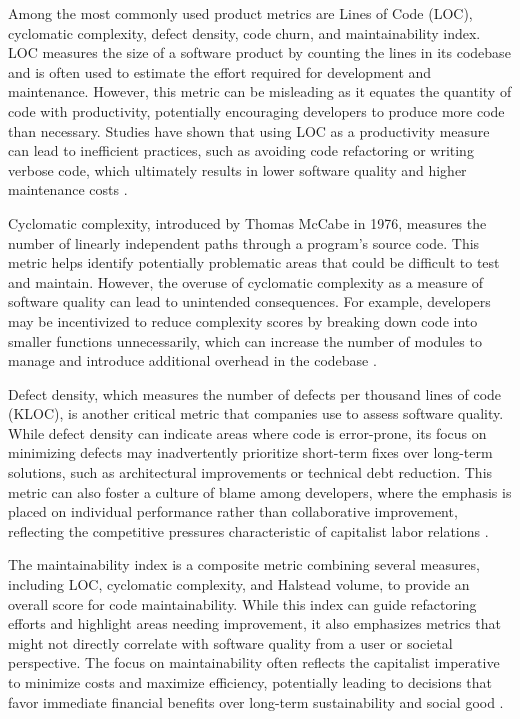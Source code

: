 \begin{refsection}
Among the most commonly used product metrics are Lines of Code (LOC), cyclomatic complexity, defect density, code churn, and maintainability index. LOC measures the size of a software product by counting the lines in its codebase and is often used to estimate the effort required for development and maintenance. However, this metric can be misleading as it equates the quantity of code with productivity, potentially encouraging developers to produce more code than necessary. Studies have shown that using LOC as a productivity measure can lead to inefficient practices, such as avoiding code refactoring or writing verbose code, which ultimately results in lower software quality and higher maintenance costs \cite[pp.~601-603]{Jones2010SoftwareEngineering}.

Cyclomatic complexity, introduced by Thomas McCabe in 1976, measures the number of linearly independent paths through a program’s source code. This metric helps identify potentially problematic areas that could be difficult to test and maintain. However, the overuse of cyclomatic complexity as a measure of software quality can lead to unintended consequences. For example, developers may be incentivized to reduce complexity scores by breaking down code into smaller functions unnecessarily, which can increase the number of modules to manage and introduce additional overhead in the codebase \cite[pp.~308-320]{McCabe1976ComplexityMeasure}.

Defect density, which measures the number of defects per thousand lines of code (KLOC), is another critical metric that companies use to assess software quality. While defect density can indicate areas where code is error-prone, its focus on minimizing defects may inadvertently prioritize short-term fixes over long-term solutions, such as architectural improvements or technical debt reduction. This metric can also foster a culture of blame among developers, where the emphasis is placed on individual performance rather than collaborative improvement, reflecting the competitive pressures characteristic of capitalist labor relations \cite[pp.~130-132]{Beck2021ExtremeProgramming}.

The maintainability index is a composite metric combining several measures, including LOC, cyclomatic complexity, and Halstead volume, to provide an overall score for code maintainability. While this index can guide refactoring efforts and highlight areas needing improvement, it also emphasizes metrics that might not directly correlate with software quality from a user or societal perspective. The focus on maintainability often reflects the capitalist imperative to minimize costs and maximize efficiency, potentially leading to decisions that favor immediate financial benefits over long-term sustainability and social good \cite[pp.~85-87]{Sayer1995RadicalPoliticalEconomy}.


\end{refsection}
